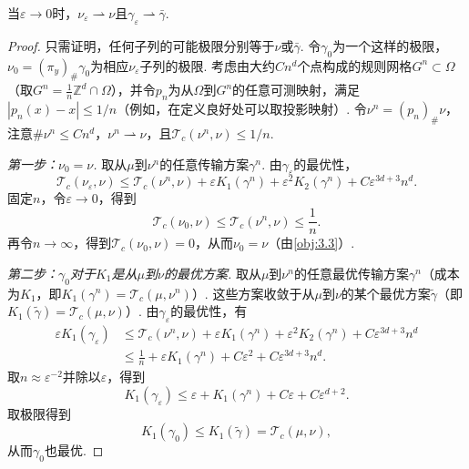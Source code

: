 \begin{lemma}\label{obj:3.20}
当$\varepsilon\to0$时，$\nu_\varepsilon\rightharpoonup\nu$且$\gamma_\varepsilon\rightharpoonup\bar\gamma$.
\end{lemma}
\begin{proof}
只需证明，任何子列的可能极限分别等于$\nu$或$\bar\gamma$. 令$\gamma_0$为一个这样的极限，$\nu_0=(\pi_y)_\#\gamma_0$为相应$\nu_\varepsilon$子列的极限. 考虑由大约$Cn^d$个点构成的规则网格$G^n\subset\Omega$（取$G^n=\frac1n\mathbb Z^d\cap\Omega$），并令$p_n$为从$\Omega$到$G^n$的任意可测映射，满足$|p_n(x)-x|\le1/n$（例如，在定义良好处可以取投影映射）. 令$\nu^n=(p_n)_\#\nu$，注意$\#\nu^n\le Cn^d$，$\nu^n\rightharpoonup\nu$，且$\mathscr T_c(\nu^n,\nu)\le1/n$.

\emph{第一步：$\nu_0=\nu$.} 取从$\mu$到$\nu^n$的任意传输方案$\gamma^n$. 由$\gamma_\varepsilon$的最优性，
\[
\mathscr T_c(\nu_\varepsilon,\nu)\le\mathscr T_c(\nu^n,\nu)+\varepsilon K_1(\gamma^n)
+\varepsilon^2K_2(\gamma^n)+C\varepsilon^{3d+3}n^d.
\]
固定$n$，令$\varepsilon\to0$，得到
\[
\mathscr T_c(\nu_0,\nu)\le\mathscr T_c(\nu^n,\nu)\le\frac1n.
\]
再令$n\to\infty$，得到$\mathscr T_c(\nu_0,\nu)=0$，从而$\nu_0=\nu$（由\autoref{obj:3.3}）.

\emph{第二步：$\gamma_0$对于$K_1$是从$\mu$到$\nu$的最优方案.} 取从$\mu$到$\nu^n$的任意最优传输方案$\gamma^n$（成本为$K_1$，即$K_1(\gamma^n)=\mathscr T_c(\mu,\nu^n)$）. 这些方案收敛于从$\mu$到$\nu$的某个最优方案$\widetilde\gamma$（即$K_1(\widetilde\gamma)=\mathscr T_c(\mu,\nu)$）. 由$\gamma_\varepsilon$的最优性，有
\begin{equation*}
\begin{aligned}
\varepsilon K_1(\gamma_\varepsilon)
&\le\mathscr T_c(\nu^n,\nu)+\varepsilon K_1(\gamma^n)+\varepsilon^2K_2(\gamma^n)+C\varepsilon^{3d+3}n^d\\
&\le\frac1n+\varepsilon K_1(\gamma^n)+C\varepsilon^2+C\varepsilon^{3d+3}n^d.
\end{aligned}
\end{equation*}
取$n\approx\varepsilon^{-2}$并除以$\varepsilon$，得到
\[
K_1(\gamma_\varepsilon)\le\varepsilon+K_1(\gamma^n)+C\varepsilon+C\varepsilon^{d+2}.
\]
取极限得到
\[
K_1(\gamma_0)\le K_1(\widetilde\gamma)=\mathscr T_c(\mu,\nu),
\]
从而$\gamma_0$也最优.


\end{proof}
